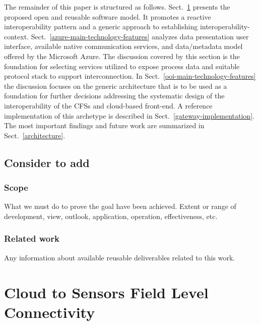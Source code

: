 \documentclass{jacsart}
\begin{document}
The remainder of this paper is structured as follows. Sect.~\ref*{cloud-to-sensors-field-level-connectivity} presents the proposed open and reusable software model. It promotes a reactive interoperability pattern and a generic approach to establishing interoperability-context. Sect.~\ref*{azure-main-technology-features} analyzes data presentation user interface, available native communication services, and data/metadata model offered by the Microsoft Azure. The discussion covered by this section is the foundation for selecting services utilized to expose process data and suitable protocol stack to support interconnection. In Sect.~\ref*{ooi-main-technology-features} the discussion focuses on the generic architecture that is to be used as a foundation for further decisions addressing the systematic design of the interoperability of the CFSs and cloud-based front-end. A reference implementation of this archetype is described in Sect.~\ref*{gateway-implementation}. The most important findings and future work are summarized in Sect.~\ref*{architecture}.

\hypertarget{consider-to-add}{%
      \subsection{Consider to add}\label{consider-to-add}}

\hypertarget{scope}{%
      \subsubsection{Scope}\label{scope}}

What we must do to prove the goal have been achieved. Extent or range of
development, view, outlook, application, operation, effectiveness, etc.

\hypertarget{related-work}{%
      \subsubsection{Related work}\label{related-work}}

Any information about available reusable deliverables related to this work.

\hypertarget{cloud-to-sensors-field-level-connectivity}{%
      \section{Cloud to Sensors Field Level Connectivity}\label{cloud-to-sensors-field-level-connectivity}}
\end{document}
